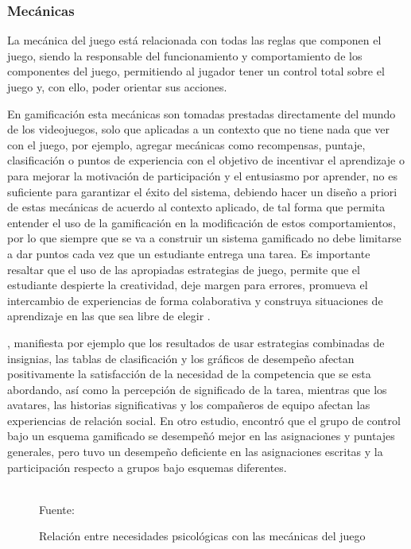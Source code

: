 \subsubsection{Mecánicas \label{sec:mecanicas}}

La mecánica del juego está relacionada con todas las reglas que componen el juego, siendo la responsable del
funcionamiento y comportamiento de los componentes del juego, permitiendo al jugador tener un control total 
sobre el juego y, con ello, poder orientar sus acciones.

En gamificación esta mecánicas son tomadas prestadas directamente del mundo de los videojuegos, solo que
aplicadas a un contexto que no tiene nada que ver con el juego, por ejemplo, agregar mecánicas como 
recompensas, puntaje, clasificación o puntos de experiencia con el objetivo de incentivar el aprendizaje o 
para mejorar la motivación de participación y el entusiasmo por aprender, no es suficiente para garantizar
el éxito del sistema, debiendo hacer un diseño a priori de estas mecánicas de acuerdo al contexto aplicado,
de tal forma que permita entender el uso de la gamificación en la modificación de estos comportamientos, por 
lo que siempre que se va a construir un sistema gamificado no debe limitarse a dar puntos cada vez que un
estudiante entrega una tarea. Es importante resaltar que el uso de las apropiadas estrategias de juego, 
permite que el estudiante despierte la creatividad, deje margen para errores, promueva el intercambio de 
experiencias de forma colaborativa y construya situaciones de aprendizaje en las que sea libre de elegir
\cite{DAROCHASEIXAS201648}.

, manifiesta por ejemplo que los resultados de usar estrategias combinadas de insignias, 
las tablas de clasificación y los gráficos de desempeño afectan positivamente la satisfacción de la necesidad
de la competencia que se esta abordando, así como la percepción de significado de la tarea, mientras que los 
avatares, las historias significativas y los compañeros de equipo afectan las experiencias de relación social. 
En otro estudio,  encontró que el grupo de control bajo un esquema gamificado se desempeñó 
mejor en las asignaciones y puntajes generales, pero tuvo un desempeño deficiente en las asignaciones escritas 
y la participación respecto a grupos bajo esquemas diferentes.

\begin{figure}[ht]
\caption{Relación entre necesidades psicológicas con las mecánicas del juego}
\label{img:mecanicas}
\centering

\\
{\footnotesize Fuente: }
\end{figure}

